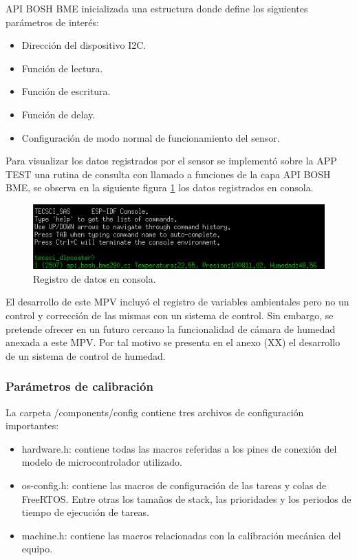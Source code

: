 API BOSH BME inicializada una estructura donde define los siguientes parámetros de interés:
\begin{itemize}
\item Dirección del dispositivo I2C.
\item Función de lectura.
\item Función de escritura.
\item Función de delay.
\item Configuración de modo normal de funcionamiento del sensor. 
\end{itemize}

Para visualizar los datos registrados por el sensor se implementó sobre la APP TEST una rutina de consulta con llamado a funciones de la capa API BOSH BME, se observa en la siguiente figura \ref{fig:api_bosh_consola} los datos registrados en consola.

\begin{figure}[h!]
	\centering
	\includegraphics[width=1\textwidth]{./Figures/registro_bme.png}
	\caption{Registro de datos en consola.}
	\label{fig:api_bosh_consola}
\end{figure}

 
El desarrollo de este MPV incluyó el registro de variables ambientales pero no un control y corrección de las mismas con un sistema de control. Sin embargo, se pretende ofrecer en un futuro cercano la funcionalidad de cámara de humedad anexada a este MPV. Por tal motivo se presenta en el anexo (XX) el desarrollo de un sistema de control de humedad.  

\subsubsection{Parámetros de calibración}
\label{subsec:calibracion}

La carpeta /components/config contiene tres archivos de configuración importantes:
\begin{itemize}
\item hardware.h: contiene todas las macros referidas a los pines de conexión del modelo de microcontrolador utilizado.
\item os-config.h: contiene las macros de configuración de las tareas y colas de FreeRTOS. Entre otras los tamaños de stack, las prioridades y los periodos de tiempo de ejecución de tareas.
\item machine.h: contiene las macros relacionadas con la calibración mecánica del equipo.
\end{itemize}


